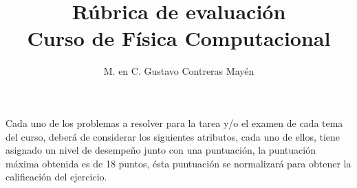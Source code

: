 \documentclass[landscape]{article}
\title{Rúbrica de evaluación \\ Curso de Física Computacional}
\author{M. en C. Gustavo Contreras Mayén}
\date{ }
\begin{document}
\maketitle
\fontsize{14}{14}\selectfont
{}
Cada uno de los problemas a resolver para la tarea y/o el examen de cada tema del curso, deberá de considerar los siguientes atributos, cada uno de ellos, tiene asignado un nivel de desempeño junto con una puntuación, la puntuación máxima obtenida es de 18 puntos, ésta puntuación se normalizará para obtener la calificación del ejercicio.
\end{document}
